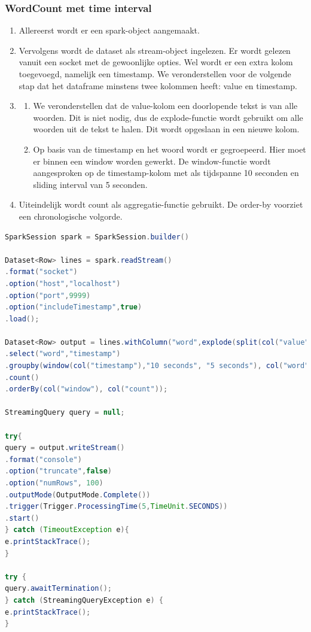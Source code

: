 \documentclass[a4paper,10pt,twoside]{report}
\begin{document}
\subsubsection{WordCount met time interval}

\begin{enumerate}
\item Allereerst wordt er een spark-object aangemaakt.
\item Vervolgens wordt de dataset als stream-object ingelezen. Er wordt gelezen vanuit een socket met de gewoonlijke opties. Wel wordt er een extra kolom toegevoegd, namelijk een timestamp. We veronderstellen voor de volgende stap dat het dataframe minstens twee kolommen heeft: value en timestamp.
\item 
\begin{enumerate}
\item We veronderstellen dat de value-kolom een doorlopende tekst is van alle woorden. Dit is niet nodig, dus de explode-functie wordt gebruikt om alle woorden uit de tekst te halen. Dit wordt opgeslaan in een nieuwe kolom.
\item Op basis van de timestamp en het woord wordt er gegroepeerd. Hier moet er binnen een window worden gewerkt. De window-functie wordt aangesproken op de timestamp-kolom met als tijdspanne 10 seconden en sliding interval van 5 seconden.
\end{enumerate}
\item Uiteindelijk wordt count als aggregatie-functie gebruikt. De order-by voorziet een chronologische volgorde.
\end{enumerate}

\begin{lstlisting}[language=Java]
SparkSession spark = SparkSession.builder()

Dataset<Row> lines = spark.readStream()
.format("socket")
.option("host","localhost")
.option("port",9999)
.option("includeTimestamp",true)
.load();

Dataset<Row> output = lines.withColumn("word",explode(split(col("value"),"\\s")))
.select("word","timestamp")
.groupby(window(col("timestamp"),"10 seconds", "5 seconds"), col("word"))
.count()
.orderBy(col("window"), col("count"));			

StreamingQuery query = null;

try{
query = output.writeStream()
.format("console")
.option("truncate",false)
.option("numRows", 100)
.outputMode(OutputMode.Complete())
.trigger(Trigger.ProcessingTime(5,TimeUnit.SECONDS))
.start()
} catch (TimeoutException e){
e.printStackTrace();
}

try {
query.awaitTermination();
} catch (StreamingQueryException e) {
e.printStackTrace();
}
\end{lstlisting}
\end{document}
